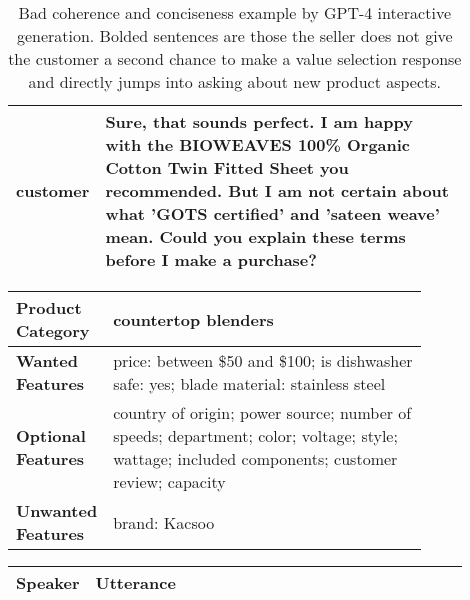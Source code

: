 \begin{table*}[t]
\begin{center}
\begin{tabular}{l p{0.9\linewidth} }
customer& Sure, that sounds perfect. I am happy with the BIOWEAVES 100\% Organic Cotton Twin Fitted Sheet you recommended. But I am not certain about what 'GOTS certified' and 'sateen weave' mean. Could you explain these terms before I make a purchase?\\
    \hline
    \end{tabular}
    \caption{Bad coherence and conciseness example by GPT-4 interactive generation. Bolded sentences are those the seller does not give the customer a second chance to make a value selection response and directly jumps into asking about new product aspects.} \label{tab:bad_coherence}
\end{center}
\end{table*}

\begin{table*}[t]
\small
\begin{center}
    \begin{tabular}{l p{0.82\linewidth} }
    \hline
    \textbf{Product Category} & countertop blenders \\ \hline
    \textbf{Wanted Features} & price: between \$50 and \$100; is dishwasher safe: yes; blade material: stainless steel \\ \hline
    \textbf{Optional Features} & country of origin; power source; number of speeds; department; color; voltage; style; wattage; included components; customer review; capacity\\ \hline
    \textbf{Unwanted Features} & brand: Kacsoo \\ \hline 
    \end{tabular}
    \begin{tabular}{l p{0.9\linewidth} }
    \hline
    \textbf{Speaker} & \textbf{Utterance} \\
    \hline


\end{tabular}
\end{center}
\end{table*}
